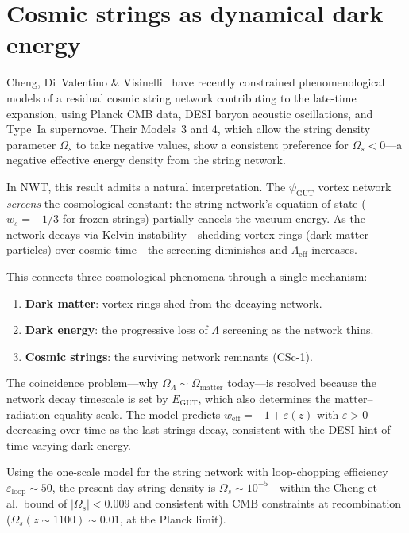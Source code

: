 \documentclass[11pt]{article}
\begin{document}
\section{Cosmic strings as dynamical dark energy}
\label{sec:dark-energy}

Cheng, Di~Valentino \& Visinelli~\cite{Cheng2026} have recently constrained phenomenological models of a residual cosmic string network contributing to the late-time expansion, using Planck CMB data, DESI baryon acoustic oscillations, and Type~Ia supernovae.
Their Models~3 and 4, which allow the string density parameter $\Omega_s$ to take negative values, show a consistent preference for $\Omega_s < 0$---a negative effective energy density from the string network.

In NWT, this result admits a natural interpretation.
The $\psi_\text{GUT}$ vortex network \emph{screens} the cosmological constant: the string network's equation of state ($w_s = -1/3$ for frozen strings) partially cancels the vacuum energy.
As the network decays via Kelvin instability---shedding vortex rings (dark matter particles) over cosmic time---the screening diminishes and $\Lambda_\text{eff}$ increases.

This connects three cosmological phenomena through a single mechanism:
\begin{enumerate}
\item \textbf{Dark matter}: vortex rings shed from the decaying network.
\item \textbf{Dark energy}: the progressive loss of $\Lambda$ screening as the network thins.
\item \textbf{Cosmic strings}: the surviving network remnants (CSc-1).
\end{enumerate}

The coincidence problem---why $\Omega_\Lambda \sim \Omega_\text{matter}$ today---is resolved because the network decay timescale is set by $E_\text{GUT}$, which also determines the matter--radiation equality scale.
The model predicts $w_\text{eff} = -1 + \varepsilon(z)$ with $\varepsilon > 0$ decreasing over time as the last strings decay, consistent with the DESI hint of time-varying dark energy.

Using the one-scale model for the string network with loop-chopping efficiency $\varepsilon_\text{loop} \sim 50$, the present-day string density is $\Omega_s \sim 10^{-5}$---within the Cheng et al.\ bound of $|\Omega_s| < 0.009$ and consistent with CMB constraints at recombination ($\Omega_s(z\sim1100) \sim 0.01$, at the Planck limit).
\end{document}
